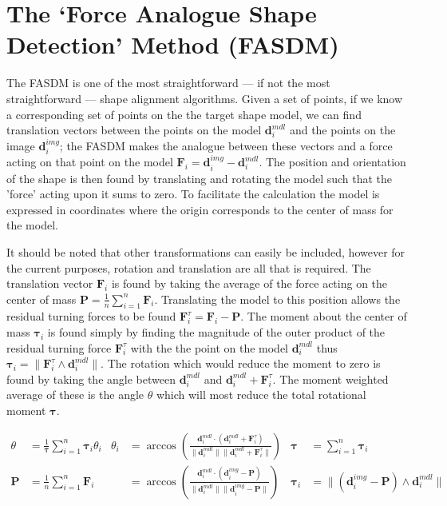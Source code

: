 \section{The `Force Analogue Shape Detection' Method (FASDM)}\label{sec:ForceAnalogue}
\newcommand{\pos}{\mathbf{P}}
\newcommand{\F}{\mathbf{F}_i}
\newcommand{\Ft}{\mathbf{F}^\tau_i}
\newcommand{\dm}{\mathbf{d}^{m{\scriptscriptstyle dl} }_i}
\newcommand{\di}{\mathbf{d}^{i{\scriptscriptstyle mg} }_i}
\newcommand{\Mt}{\mathbf{\tau}_i}
The FASDM is one of the most straightforward --- if not the most straightforward --- shape alignment algorithms. Given a set of points, if we know a corresponding set of points on the the target shape model, we can find translation vectors between the points on the model $\dm$ and the points  on the image $\di$; the FASDM makes the analogue between these vectors and a force acting on that point on the model $\F=\di-\dm$. The position and orientation of the shape is then found by translating and rotating the model such that the 'force' acting upon it sums to zero. To facilitate the calculation the model is expressed in coordinates where the origin corresponds to the center of mass for the model.

It should be noted that other transformations can easily be included, however for the current purposes, rotation and translation are all that is required.
The translation vector $\F$ is found by taking the average of the force acting on the center of mass $\pos= \frac{1} {n} \sum_{i=1}^n \F$. 
Translating the model to this position allows the residual turning forces to be found $\Ft = \F - \pos$. 
The moment about the center of mass $\Mt$ is found simply by finding the magnitude of the outer product of the residual turning force $\Ft$ with the the point on the model $\dm$ thus $\Mt = \lVert \Ft \wedge \dm \rVert$. 
The rotation which would reduce the moment to zero is found by taking the angle between $\dm$ and $\dm+\Ft$.
The moment weighted average of these is the angle $\theta$ which will most reduce the total rotational moment $\mathbf{\tau} $. 

\begin{align*}
\theta &= \frac{1} {\mathbf{\tau}} \sum_{i=1}^{n} \Mt \theta_i &
\theta_i &=  \arccos \left(\frac{\dm \cdot (\dm+\Ft)}{\lVert \dm \rVert \lVert \dm+\Ft \rVert}\right)  &
\mathbf{\tau} &= \sum_{i=1}^{n} \Mt \\
\pos &= \frac{1} {n} \sum_{i=1}^n \F &
  &=  \arccos \left(\frac{\dm \cdot (\di - \pos)}{\lVert \dm \rVert \lVert \di - \pos \rVert}\right)  &
\Mt &= \lVert (\di - \pos) \wedge \dm \rVert
\end{align*}

